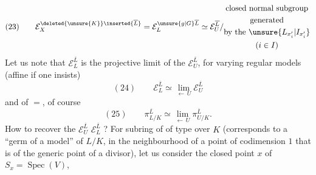 \[
(23)\qquad
\mathcal E_X^{\deleted{\unsure{K}}\inserted{\overline L}}
=\mathcal E_L^{\unsure{g|G}\overline L}
\simeq\mathcal E_U^{\overline L}/\begin{gathered}\text{closed normal subgroup}\\\text{generated}\\\text{by the }\unsure{L_{x_i'}|I_{x_i'}}\\(i\in I)\end{gathered}
\]
Let us note that $\mathcal E_L^{\overline L}$ is the projective limit of the $\mathcal E_U^{\overline L}$, for varying regular models (affine if one insists)
\[
(24)\qquad\mathcal E_L^{\overline L}\simeq\lim_{\longleftarrow\,U}\mathcal E_U^{\overline L}
\]
and of $=$, of course
\[
(25)\qquad\pi_{L/K}^{\overline L}\simeq\lim_{\longleftarrow\,U}\pi_{U/K}^{\overline L}.
\]
How to recover the $\mathcal E_U^{\overline L}$  $\mathcal E_L^{\overline L}$ ? For \uline{} subring  of  of  type over $K$ (corresponds to a ``germ of a model'' of $L/K$, in the neighbourhood of a point of codimension $1$ that is of the generic point of a divisor), let us consider the closed point $x$ of $S_x=\operatorname{Spec}(V)$,
